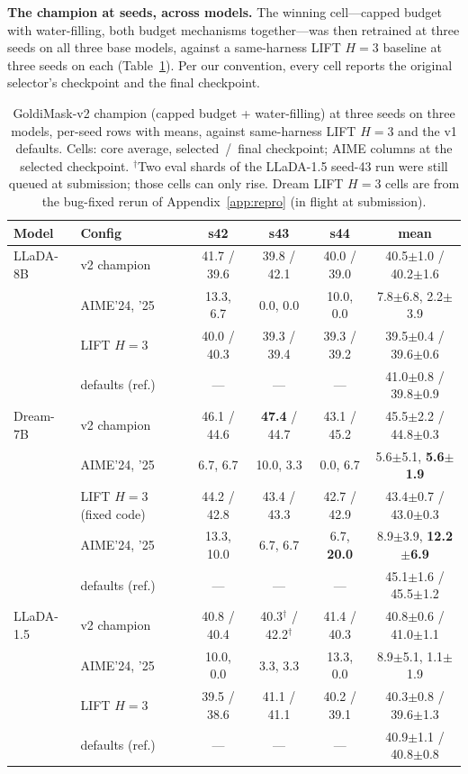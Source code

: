 \documentclass{article} %
\begin{document}
\textbf{The champion at seeds, across models.} The winning cell---capped budget with water-filling, both budget mechanisms together---was then retrained at three seeds on all three base models, against a same-harness LIFT $H{=}3$ baseline at three seeds on each (Table~\ref{tab:v2champ}). Per our convention, every cell reports the original selector's checkpoint and the final checkpoint.

\begin{table}[t]
\caption{GoldiMask-v2 champion (capped budget + water-filling) at three seeds on three models, per-seed rows with means, against same-harness LIFT $H{=}3$ and the v1 defaults. Cells: core average, selected~/~final checkpoint; AIME columns at the selected checkpoint. $^\dagger$Two eval shards of the LLaDA-1.5 seed-43 run were still queued at submission; those cells can only rise. Dream LIFT $H{=}3$ cells are from the bug-fixed rerun of Appendix~\ref{app:repro} (in flight at submission).}
\label{tab:v2champ}
\begin{center}
\begin{tabular}{llcccc}
\toprule
Model & Config & s42 & s43 & s44 & mean \\
\midrule
LLaDA-8B & v2 champion & 41.7 / 39.6 & 39.8 / 42.1 & 40.0 / 39.0 & 40.5$\pm$1.0 / 40.2$\pm$1.6 \\
         & \quad AIME'24, '25 & 13.3, 6.7 & 0.0, 0.0 & 10.0, 0.0 & 7.8$\pm$6.8, 2.2$\pm$3.9 \\
         & LIFT $H{=}3$ & 40.0 / 40.3 & 39.3 / 39.4 & 39.3 / 39.2 & 39.5$\pm$0.4 / 39.6$\pm$0.6 \\
         & defaults (ref.) & --- & --- & --- & 41.0$\pm$0.8 / 39.8$\pm$0.9 \\
\midrule
Dream-7B & v2 champion & 46.1 / 44.6 & \textbf{47.4} / 44.7 & 43.1 / 45.2 & 45.5$\pm$2.2 / 44.8$\pm$0.3 \\
         & \quad AIME'24, '25 & 6.7, 6.7 & 10.0, 3.3 & 0.0, 6.7 & 5.6$\pm$5.1, \textbf{5.6$\pm$1.9} \\
         & LIFT $H{=}3$ (fixed code) & 44.2 / 42.8 & 43.4 / 43.3 & 42.7 / 42.9 & 43.4$\pm$0.7 / 43.0$\pm$0.3 \\
         & \quad AIME'24, '25 & 13.3, 10.0 & 6.7, 6.7 & 6.7, \textbf{20.0} & 8.9$\pm$3.9, \textbf{12.2$\pm$6.9} \\
         & defaults (ref.) & --- & --- & --- & 45.1$\pm$1.6 / 45.5$\pm$1.2 \\
\midrule
LLaDA-1.5 & v2 champion & 40.8 / 40.4 & 40.3$^\dagger$ / 42.2$^\dagger$ & 41.4 / 40.3 & 40.8$\pm$0.6 / 41.0$\pm$1.1 \\
          & \quad AIME'24, '25 & 10.0, 0.0 & 3.3, 3.3 & 13.3, 0.0 & 8.9$\pm$5.1, 1.1$\pm$1.9 \\
          & LIFT $H{=}3$ & 39.5 / 38.6 & 41.1 / 41.1 & 40.2 / 39.1 & 40.3$\pm$0.8 / 39.6$\pm$1.3 \\
          & defaults (ref.) & --- & --- & --- & 40.9$\pm$1.1 / 40.8$\pm$0.8 \\
\bottomrule
\end{tabular}
\end{center}
\end{table}
\end{document}
